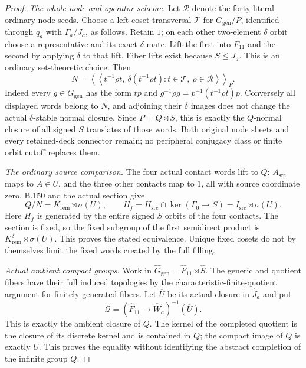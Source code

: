 \begin{proof}
\emph{The whole node and operator scheme.}
Let $\mathscr R$ denote the forty literal ordinary node seeds.
Choose a left-coset transversal $\mathscr T$ for $G_{\mathrm{gen}}/P$,
identified through $q_a$ with $\Gamma_a/J_a$, as follows. Retain $1$;
on each other two-element $\delta$ orbit choose a representative and
its exact $\delta$ mate. Lift the first into $F_{11}$ and the second
by applying $\delta$ to that lift. Fiber lifts exist because $S\le J_a$.
This is an ordinary set-theoretic choice. Then
\begin{equation}\label{eq:B155-node-scheme}
 N=\left\langle\!\left\langle
 t^{-1}\rho t,\ \delta(t^{-1}\rho t):
 t\in\mathscr T,\ \rho\in\mathscr R
 \right\rangle\!\right\rangle_P .
\end{equation}
Indeed every $g\in G_{\mathrm{gen}}$ has the form $tp$ and
$g^{-1}\rho g=p^{-1}(t^{-1}\rho t)p$. Conversely all displayed words
belong to $N$, and adjoining their $\delta$ images does not change the
actual $\delta$-stable normal closure. Since $P=Q\rtimes S$, this is
exactly the $Q$-normal closure of all signed $S$ translates of those
words. Both original node sheets and every retained-deck connector
remain; no peripheral conjugacy class or finite orbit cutoff replaces
them.

\emph{The ordinary source comparison.}
The four actual contact words lift to $Q$: $A_{\mathrm{src}}$ maps to
$A\in U$, and the three other contacts map to $1$, all with source
coordinate zero. B.150 and the actual section give
\[
 Q/N=K_{\mathrm{rem}}\rtimes\sigma(U),\qquad
 H_f=H_{\mathrm{src}}\cap\ker(\Gamma_0\to S)
     =I_{\mathrm{src}}\rtimes\sigma(U).
\]
Here $H_f$ is generated by the entire signed $S$ orbits of the four
contacts. The section is fixed, so the fixed subgroup of the first
semidirect product is
$K_{\mathrm{rem}}^\delta\rtimes\sigma(U)$.
This proves the stated equivalence. Unique fixed cosets do not by
themselves limit the fixed words created by the full filling.

\emph{Actual ambient compact groups.}
Work in $\widehat G_{\mathrm{gen}}=\widehat F_{11}\rtimes\widehat S$.
The generic and quotient fibers have their full induced topologies
by the characteristic-finite-quotient argument for finitely generated
fibers. Let $\overline U$ be its actual closure in $\widehat J_a$ and put
\[
 \mathcal Q=(\widehat F_{11}\to\widehat W_a)^{-1}(\overline U).
\]
This is exactly the ambient closure of $Q$. The kernel of the
completed quotient is the closure of its discrete kernel and is
contained in $\overline Q$; the compact image of $\overline Q$ is
exactly $\overline U$. This proves the equality without identifying
the abstract completion of the infinite group $Q$.


\end{proof}
